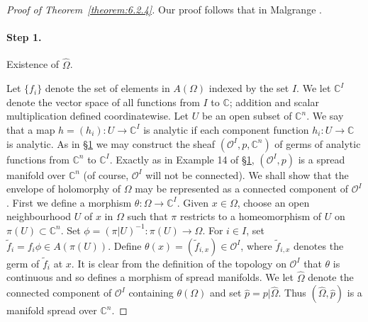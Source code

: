 \begin{proof}[Proof of Theorem~\ref{theorem:6.2.4}]
Our proof follows that in Malgrange \cite{bib:II:malgrange-b:2}.
\paragraph{Step 1.} Existence of $\widehat\Omega$.

Let $\{f_i\}$ denote the set of elements in $A(\Omega)$ indexed by the set $I$. We let $\mathbb C^I$ denote the vector space of all functions from $I$ to $\mathbb C$; addition and scalar multiplication defined coordinatewise. Let $U$ be an open subset of $\mathbb C^n$. We say that a map $h=(h_i):U\to\mathbb C^I$ is analytic if each component function $h_i:U\to\mathbb C$ is analytic. As in \hyperref[sec:6:1]{\S1} we may construct the sheaf $(\mathcal O^I,p,\mathbb C^n)$ of germs of analytic functions from $\mathbb C^n$ to $\mathbb C^I$. Exactly as in Example 14 of \hyperref[sec:6:1]{\S1}, $(\mathcal O^I,p)$ is a spread manifold over $\mathbb C^n$ (of course,
$\mathcal O^I$ will not be connected). We shall show that the envelope of holomorphy of $\Omega$ may be represented as a connected component of $\mathcal O^I$. First we define a morphism $\theta:\Omega\to\mathbb C^I$. Given $x\in\Omega$, choose an open neighbourhood $U$ of $x$ in $\Omega$ such that $\pi$ restricts to a homeomorphism of $U$ on $\pi(U)\subset\mathbb C^n$. Set $\phi=(\pi|U)^{-1}:\pi(U)\to\Omega$. For $i\in I$, set $\widetilde f_i=f_i\phi\in A(\pi(U))$. Define $\theta(x)=(\widetilde f_{i,x})\in\mathcal O^I$, where $\widetilde f_{i,x}$ denotes the germ of $\widetilde f_i$ at $x$. It is clear from the definition of the topology on $\mathcal O^I$ that $\theta$ is continuous and so defines a morphism of spread manifolds. We let $\widehat\Omega$ denote the connected component of $\mathcal O^I$ containing $\theta(\Omega)$ and set $\widehat p=p|\widehat\Omega$. Thus $(\widehat\Omega,\widehat p)$ is a manifold spread over $\mathbb C^n$.


\end{proof}
